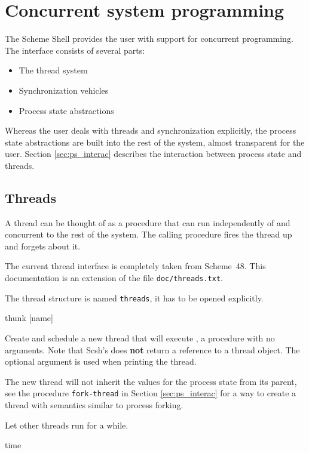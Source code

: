 
\chapter{Concurrent system programming}

The Scheme Shell provides the user with support for concurrent programming.
The interface consists of several parts:
\begin{itemize}
\item The thread system 
\item Synchronization vehicles 
\item Process state abstractions
\end{itemize}
Whereas the user deals with threads and synchronization explicitly,
the process state abstractions are built into the rest of the system,
almost transparent for the user. Section \ref{sec:ps_interac}
describes the interaction between process state and threads.

\section{Threads}

A thread can be thought of as a procedure that can run independently of
and concurrent to the rest of the system. The calling procedure fires
the thread up and forgets about it.

The current thread interface is completely taken from Scheme\ 48. This
documentation is an extension of the file \texttt{doc/threads.txt}.

The thread structure is named \texttt{threads}, it has to be opened explicitly.

 {thunk [name]} \undefined 

Create and schedule a new thread that will execute , a
procedure with no arguments. Note that Scsh's  does
\textbf{not} return a reference to a thread object. The optional
argument  is used when printing the thread. 

The new thread will not inherit the values for the process state from
its parent, see the procedure \texttt{fork-thread} in Section
\ref{sec:ps_interac} for a way to create a thread with
semantics similar to process forking.

 {} \undefined

Let other threads run for a while. 

 {time} \undefined

